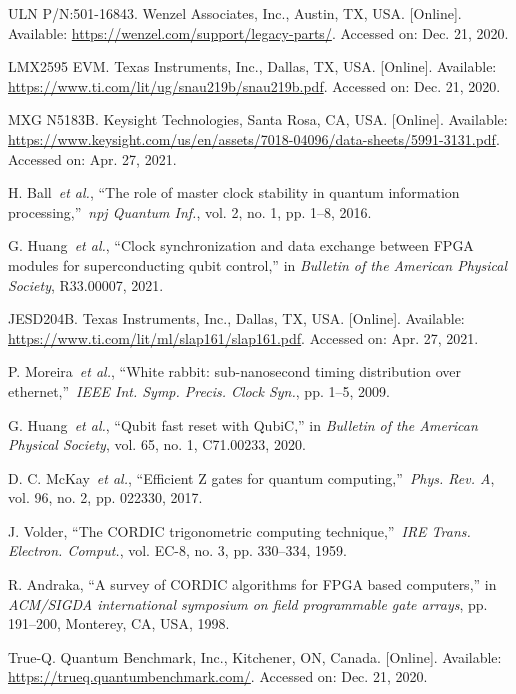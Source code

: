 \documentclass{ieeetran}
\begin{document}
\begin{thebibliography}{00}
 ULN P/N:501-16843. Wenzel Associates, Inc., Austin, TX, USA. [Online]. Available: 
\ul{https://wenzel.com/support/legacy-parts/}. Accessed on: Dec. 21, 2020.

 LMX2595 EVM. Texas Instruments, Inc., Dallas, TX, USA. [Online]. Available: 
\ul{https://www.ti.com/lit/ug/snau219b/snau219b.pdf}. Accessed on: Dec. 21, 2020.

 MXG N5183B. Keysight Technologies, Santa Rosa, CA, USA. [Online]. Available: 
\ul{https://www.keysight.com/us/en/assets/7018-04096/data-sheets/5991-3131.pdf}. Accessed on: Apr. 27, 2021.

 H. Ball~\emph{et al.}, ``The role of master clock stability in quantum information processing,''~\emph{npj Quantum Inf.}, vol. 2, no. 1, pp. 1--8, 2016.

 G. Huang~\emph{et al.}, ``Clock synchronization and data exchange between FPGA modules for superconducting qubit control,'' in \emph{Bulletin of the American Physical Society}, R33.00007, 2021.

 JESD204B. Texas Instruments, Inc., Dallas, TX, USA. [Online]. Available: 
\ul{https://www.ti.com/lit/ml/slap161/slap161.pdf}. Accessed on: Apr. 27, 2021.

 P. Moreira~\emph{et al.}, ``White rabbit: sub-nanosecond timing distribution over ethernet,''~\emph{IEEE Int. Symp. Precis. Clock Syn.}, pp. 1--5, 2009.

 G. Huang~\emph{et al.}, ``Qubit fast reset with QubiC,'' in \emph{Bulletin of the American Physical Society}, vol. 65, no. 1, C71.00233, 2020.

 D. C. McKay~\emph{et al.}, ``Efficient Z gates for quantum computing,''~\emph{Phys. Rev. A}, vol. 96, no. 2, pp. 022330, 2017.

 J. Volder, ``The CORDIC trigonometric computing technique,''~\emph{IRE Trans. Electron. Comput.}, vol. EC-8, no. 3, pp. 330--334, 1959.

 R. Andraka, ``A survey of CORDIC algorithms for FPGA based computers,'' in \emph{ACM/SIGDA international symposium on field programmable gate arrays}, pp. 191--200, Monterey, CA, USA, 1998.

 True-Q. Quantum Benchmark, Inc., Kitchener, ON, Canada. [Online]. Available: 
\ul{https://trueq.quantumbenchmark.com/}. Accessed on: Dec. 21, 2020.


\end{thebibliography}
\end{document}

